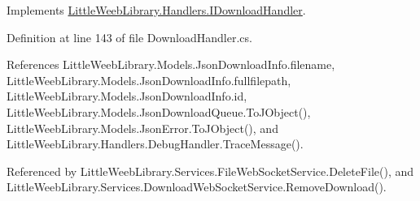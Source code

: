 Implements \mbox{\hyperlink{interface_little_weeb_library_1_1_handlers_1_1_i_download_handler_aca5dc8dc1965f09d2a5860f9297ddb26}{Little\+Weeb\+Library.\+Handlers.\+I\+Download\+Handler}}.



Definition at line 143 of file Download\+Handler.\+cs.



References Little\+Weeb\+Library.\+Models.\+Json\+Download\+Info.\+filename, Little\+Weeb\+Library.\+Models.\+Json\+Download\+Info.\+fullfilepath, Little\+Weeb\+Library.\+Models.\+Json\+Download\+Info.\+id, Little\+Weeb\+Library.\+Models.\+Json\+Download\+Queue.\+To\+J\+Object(), Little\+Weeb\+Library.\+Models.\+Json\+Error.\+To\+J\+Object(), and Little\+Weeb\+Library.\+Handlers.\+Debug\+Handler.\+Trace\+Message().



Referenced by Little\+Weeb\+Library.\+Services.\+File\+Web\+Socket\+Service.\+Delete\+File(), and Little\+Weeb\+Library.\+Services.\+Download\+Web\+Socket\+Service.\+Remove\+Download().


